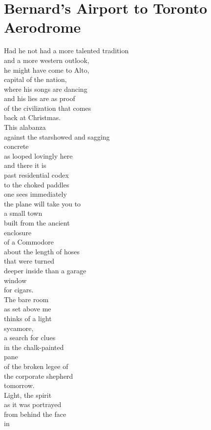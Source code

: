 \documentclass[smalldemyvopaper,11pt,twoside,onecolumn,openright,extrafontsizes]{memoir}
\begin{document}
\chapter{Bernard's Airport to Toronto Aerodrome}
Had he not had a more talented tradition
\\and a more western outlook,
\\he might have come to Alto,
\\capital of the nation,
\\where his songs are dancing
\\and his lies are as proof
\\of the civilization that comes
\\back at Christmas.
\\This alabanza
\\against the starshowed and sagging
\\concrete
\\as looped lovingly here
\\and there it is
\\past residential codex
\\to the choked paddles
\\one sees immediately
\\the plane will take you to
\\a small town
\\built from the ancient
\\enclosure
\\of a Commodore
\\about the length of hoses
\\that were turned
\\deeper inside than a garage
\\window
\\for cigars.
\\The bare room
\\as set above me
\\thinks of a light
\\sycamore,
\\a search for clues
\\in the chalk-painted
\\pane
\\of the broken legee of
\\the corporate shepherd
\\tomorrow.
\\Light, the spirit
\\as it was portrayed
\\from behind the face
\\in
\end{document}
